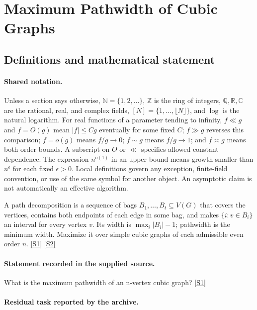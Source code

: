 \documentclass[11pt,a4paper]{article}
\newcommand{\N}{\mathbb{N}}
\newcommand{\Z}{\mathbb{Z}}
\newcommand{\Q}{\mathbb{Q}}
\newcommand{\R}{\mathbb{R}}
\newcommand{\C}{\mathbb{C}}
\newcommand{\sref}[2]{\hyperlink{source:#1:#2}{[S#2]}}
\begin{document}
\section{Maximum Pathwidth of Cubic Graphs}\label{statement}


\subsection{Definitions and mathematical statement}

\paragraph{Shared notation.}Unless a section says otherwise, $\N=\{1,2,\ldots\}$,
$\Z$ is the ring of integers, $\Q,\R,\C$ are the rational, real, and complex
fields, $[N]=\{1,\ldots,\lfloor N\rfloor\}$, and $\log$ is the natural
logarithm. For real functions of a parameter tending to infinity,
$f\ll g$ and $f=O(g)$ mean $|f|\leq Cg$ eventually for some fixed $C$;
$f\gg g$ reverses this comparison; $f=o(g)$ means $f/g\to0$;
$f\sim g$ means $f/g\to1$; and $f\asymp g$ means both order bounds.
A subscript on $O$ or $\ll$ specifies allowed constant dependence.
The expression $n^{o(1)}$ in an upper bound means growth smaller than
$n^\epsilon$ for each fixed $\epsilon>0$. Local definitions govern any
exception, finite-field convention, or use of the same symbol for another
object. An asymptotic claim is not automatically an effective algorithm.



A path decomposition is a sequence of bags $B_1,\ldots,B_t\subseteq V(G)$ that covers the vertices, contains both endpoints of each edge in some bag, and makes $\{i:v\in B_i\}$ an interval for every vertex $v$. Its width is $\max_i|B_i|-1$; pathwidth is the minimum width. Maximize it over simple cubic graphs of each admissible even order $n$. \sref{statement}{1} \sref{statement}{2}

\paragraph{Statement recorded in the supplied source.}
What is the maximum pathwidth of an n-vertex cubic graph? \sref{statement}{1}

\paragraph{Residual task reported by the archive.}
\end{document}
